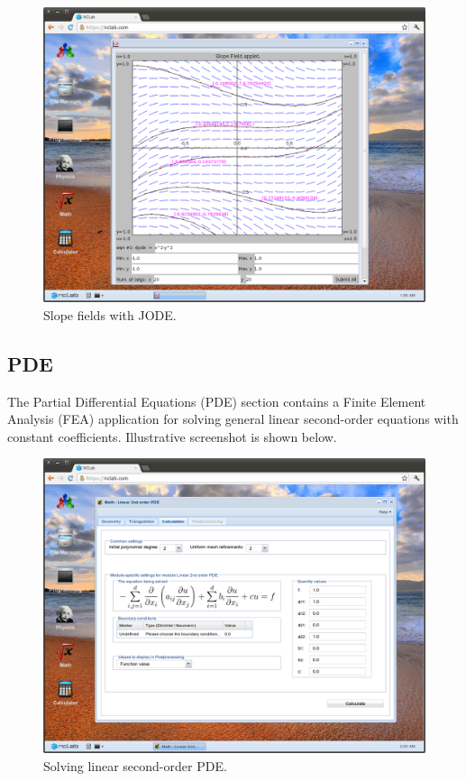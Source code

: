 \documentclass{article}
\begin{document}
\begin{figure}[!ht]
\begin{center}
\includegraphics[width=\textwidth]{img/jode1.png}
\end{center}
\caption{Slope fields with JODE.}
\label{fig:jode1}
\end{figure}


\subsection{PDE}

The Partial Differential Equations (PDE) section contains a Finite Element Analysis (FEA)
application for solving general linear second-order equations with constant coefficients.
Illustrative screenshot is shown below.
\newpage
\begin{figure}[!ht]
\begin{center}
\includegraphics[width=\textwidth]{img/pde1.png}
\end{center}
\caption{Solving linear second-order PDE.}
\label{fig:pde1}
\end{figure}
\end{document}
